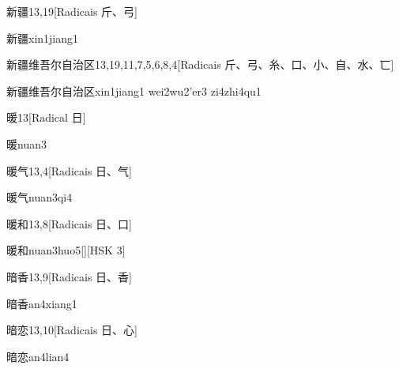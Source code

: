 \begin{entry}{新疆}{13,19}[Radicais ⽄、⼸]
  \begin{phonetics}{新疆}{xin1jiang1}
  \end{phonetics}
\end{entry}

\begin{entry}{新疆维吾尔自治区}{13,19,11,7,5,6,8,4}[Radicais ⽄、⼸、⽷、⼝、⼩、⾃、⽔、⼖]
  \begin{phonetics}{新疆维吾尔自治区}{xin1jiang1 wei2wu2'er3 zi4zhi4qu1}
  \end{phonetics}
\end{entry}

\begin{entry}{暖}{13}[Radical ⽇]
  \begin{phonetics}{暖}{nuan3}
  \end{phonetics}
\end{entry}

\begin{entry}{暖气}{13,4}[Radicais ⽇、⽓]
  \begin{phonetics}{暖气}{nuan3qi4}
  \end{phonetics}
\end{entry}

\begin{entry}{暖和}{13,8}[Radicais ⽇、⼝]
  \begin{phonetics}{暖和}{nuan3huo5}[][HSK 3]
  \end{phonetics}
\end{entry}

\begin{entry}{暗香}{13,9}[Radicais ⽇、⾹]
  \begin{phonetics}{暗香}{an4xiang1}
  \end{phonetics}
\end{entry}

\begin{entry}{暗恋}{13,10}[Radicais ⽇、⼼]
  \begin{phonetics}{暗恋}{an4lian4}
  \end{phonetics}
\end{entry}

